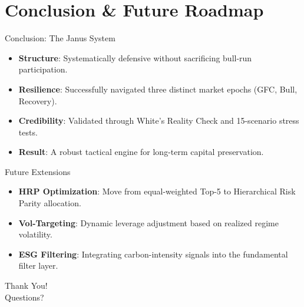 \documentclass[10pt]{beamer}
\begin{document}
\section{Conclusion \& Future Roadmap}

\begin{frame}{Conclusion: The Janus System}
    \begin{itemize}
        \item \textbf{Structure}: Systematically defensive without sacrificing bull-run participation.
        \item \textbf{Resilience}: Successfully navigated three distinct market epochs (GFC, Bull, Recovery).
        \item \textbf{Credibility}: Validated through White's Reality Check and 15-scenario stress tests.
        \item \textbf{Result}: A robust tactical engine for long-term capital preservation.
    \end{itemize}
\end{frame}

\begin{frame}{Future Extensions}
    \begin{itemize}
        \item \textbf{HRP Optimization}: Move from equal-weighted Top-5 to Hierarchical Risk Parity allocation.
        \item \textbf{Vol-Targeting}: Dynamic leverage adjustment based on realized regime volatility.
        \item \textbf{ESG Filtering}: Integrating carbon-intensity signals into the fundamental filter layer.
    \end{itemize}
\end{frame}

\begin{frame}[standout]
    Thank You! \\
    Questions?
\end{frame}
\end{document}
